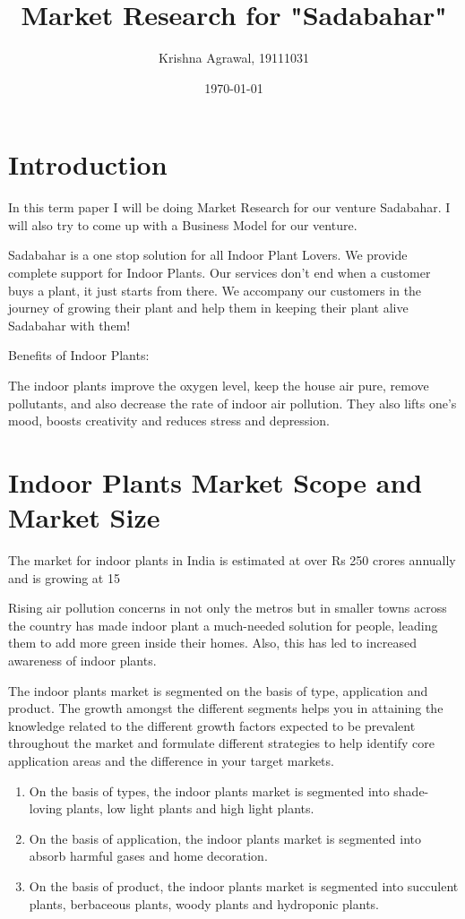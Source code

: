 \documentclass{article}
\title{Market Research for "Sadabahar"}
\author{Krishna Agrawal, 19111031}
\date{\today}
\begin{document}
\maketitle


\section{Introduction}

In this term paper I will be doing Market Research for our venture Sadabahar. I will also try to come up with a Business Model for our venture.

Sadabahar is a one stop solution for all Indoor Plant Lovers. We provide complete support for Indoor Plants. Our services don't end when a customer buys a plant, it just starts from there. 
We accompany our customers in the journey of growing their plant and help them in keeping their plant alive Sadabahar with them! 
 
Benefits of Indoor Plants:

The indoor plants improve the oxygen level, keep the house air pure, remove pollutants, and also decrease the rate of indoor air pollution. They also lifts one’s mood, boosts creativity and reduces stress and depression.


\section{Indoor Plants Market Scope and Market Size}

The market for indoor plants in India is estimated at over Rs 250 crores annually and is growing at 15%

Rising air pollution concerns in not only the metros but in smaller towns across the country has made indoor plant a much-needed solution for people, leading them to add more green inside their homes. Also, this has led to increased awareness of indoor plants.

The indoor plants market is segmented on the basis of type, application and product. The growth amongst the different segments helps you in attaining the knowledge related to the different growth factors expected to be prevalent throughout the market and formulate different strategies to help identify core application areas and the difference in your target markets.   

\begin{enumerate}

\item On the basis of types, the indoor plants market is segmented into shade- loving plants, low light plants and high light plants.
\item On the basis of application, the indoor plants market is segmented into absorb harmful gases and home decoration.
\item On the basis of product, the indoor plants market is segmented into succulent plants, berbaceous plants, woody plants and hydroponic plants.
\end{enumerate}
\end{document}
